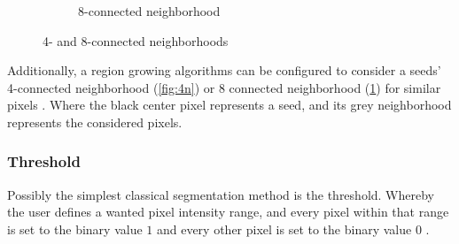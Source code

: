 \begin{figure}[h!]
\begin{subfigure}{0.49\textwidth}
{}
		\caption{8-connected neighborhood}\label{fig:8n}
	\end{subfigure}
	\caption{4- and 8-connected neighborhoods}\label{fig:neighborhoods}
\end{figure}

\noindent
Additionally, a region growing algorithms can be configured to consider a seeds' 4-connected neighborhood
(\cref{fig:4n}) or 8 connected neighborhood (\cref{fig:8n}) for similar pixels \cite{jourlinVariousContrastConcepts2016,palReviewImageSegmentation1993}.
Where the black center pixel represents a seed, and its grey neighborhood represents the considered pixels.


\subsubsection{Threshold}
Possibly the simplest classical segmentation method is the threshold.
Whereby the user defines a wanted pixel intensity range, and every pixel within that range is set to the binary value $1$
and every other pixel is set to the binary value $0$ \cite{sankurSurveyImageThresholding2004}.

